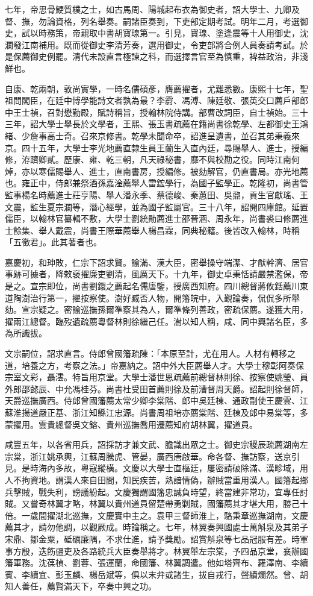 \begin{pinyinscope}
七年，帝思骨鯁質樸之士，如古馬周、陽城起布衣為御史者，詔大學士、九卿及督、撫，勿論資格，列名舉奏。嗣諸臣奏到，下吏部定期考試。明年二月，考選御史，試以時務策，帝親取中書胡寶瑔第一。引見，寶瑔、塗逢震等十人用御史，沈瀾發江南補用。既而從御史李清芳奏，選用御史，令吏部將合例人員奏請考試。於是保薦御史例罷。清代未設直言極諫之科，而選擇言官至為慎重，裨益政治，非淺鮮也。

自康、乾兩朝，敦尚實學，一時名儒碩彥，膺薦擢者，尤難悉數。康熙十七年，聖祖問閣臣，在廷中博學能詩文者孰為最？李霨、馮溥、陳廷敬、張英交口薦戶部郎中王士禎，召對懋勤殿，賦詩稱旨，授翰林院侍講。部曹改詞臣，自士禎始。三十三年，詔大學士舉長於文學者，王熙、張玉書疏薦在籍尚書徐乾學、左都御史王鴻緒、少詹事高士奇。召來京修書。乾學未聞命卒，詔進呈遺書，並召其弟秉義來京。四十五年，大學士李光地薦直隸生員王蘭生入直內廷，尋賜舉人、進士，授編修，洊躋卿貳。歷康、雍、乾三朝，凡天祿秘書，靡不與校勘之役。同時江南何焯，亦以寒儒賜舉人、進士，直南書房，授編修。被劾解官，仍直書局。亦光地薦也。雍正中，侍郎兼祭酒孫嘉淦薦舉人雷鋐學行，為國子監學正。乾隆初，尚書管監事楊名時薦進士莊亨陽、舉人潘永季、蔡德峻、秦蕙田、吳鼐，貢生官獻瑤、王文震，監生夏宗瀾等，潛心經學，並為國子監屬官。三十八年，詔開四庫館。延置儒臣，以翰林官纂輯不敷，大學士劉統勛薦進士邵晉涵、周永年，尚書裘曰修薦進士餘集、舉人戴震，尚書王際華薦舉人楊昌霖，同典秘籍。後皆改入翰林，時稱「五徵君」。此其著者也。

嘉慶初，和珅敗，仁宗下詔求賢。諭滿、漢大臣，密舉操守端潔、才猷幹濟、居官事跡可據者，降敕褎擢廉吏劉清，風厲天下。十九年，御史卓秉恬請嚴禁濫保，帝是之。宣宗即位，尚書劉鐶之薦起名儒唐鑒，授廣西知府。四川總督蔣攸銛薦川東道陶澍治行第一，擢按察使。澍好臧否人物，開籓皖中，入覲論奏，侃侃多所舉劾。宣宗疑之。密諭巡撫孫爾準察其為人，爾準條列善政，密疏保薦。遂獲大用，擢兩江總督。臨歿遺疏薦粵督林則徐繼己任。澍以知人稱，咸、同中興諸名臣，多為所識拔。

文宗嗣位，詔求直言。侍郎曾國籓疏陳：「本原至計，尤在用人。人材有轉移之道，培養之方，考察之法。」帝嘉納之。詔中外大臣薦舉人才。大學士穆彰阿奏保宗室文彩，聶澐。特旨用京堂。大學士潘世恩疏薦前總督林則徐、按察使姚瑩、員外郎邵懿辰、中允馮桂芬。尚書杜受田首薦則徐及前漕督周天爵。詔起則徐督師，天爵巡撫廣西。侍郎曾國籓薦太常少卿李棠階、郎中吳廷棟、通政副使王慶雲、江蘇淮揚道嚴正基、浙江知縣江忠源。尚書周祖培亦薦棠階、廷棟及郎中易棠等，多蒙擢用。雲貴總督吳文鎔、貴州巡撫喬用遷薦知府胡林翼，擢道員。

咸豐五年，以各省用兵，詔採訪才兼文武、膽識出眾之士。御史宗稷辰疏薦湖南左宗棠，浙江姚承輿，江蘇周騰虎、管晏，廣西唐啟華。命各督、撫訪察，送京引見。是時海內多故，粵寇縱橫。文慶以大學士直樞廷，屢密請破除滿、漢畛域，用人不拘資地。謂漢人來自田間，知民疾苦，熟諳情偽，辦賊當重用漢人。國籓起鄉兵擊賊，戰失利，謗議紛起。文慶獨謂國籓忠誠負時望，終當建非常功，宜專任討賊。又嘗奇林翼才略，林翼以貴州道員留楚帶勇剿賊，國籓薦其才堪大用，勝己十倍。一歲間擢湖北巡撫，文慶實中主之。袁甲三督師淮上，駱秉章巡撫湖南，文慶薦其才，請勿他調，以觀厥成。時論稱之。七年，林翼奏興國處士萬斛泉及其弟子宋鼎、鄒金粟，砥礪廉隅，不求仕進，請予獎勵。詔賞斛泉等七品冠服有差。時軍事方殷，迭飭疆吏及各路統兵大臣奏舉將才。林翼舉左宗棠，予四品京堂，襄辦國籓軍務。沈葆楨、劉蓉、張運蘭，命國籓、林翼調遣。他如塔齊布、羅澤南、李續賓、李續宜、彭玉麟、楊岳斌等，俱以末弁或諸生，拔自戎行，聲績爛然。曾、胡知人善任，薦賢滿天下，卒奏中興之功。


\end{pinyinscope}

